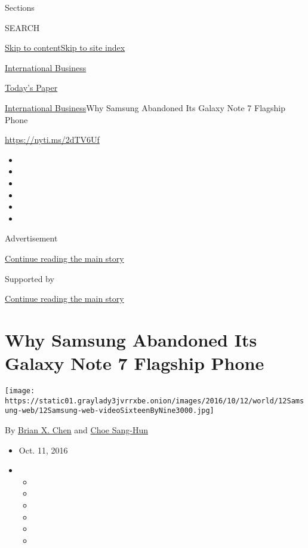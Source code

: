 Sections

SEARCH

\protect\hyperlink{site-content}{Skip to
content}\protect\hyperlink{site-index}{Skip to site index}

\href{https://www.nytimes3xbfgragh.onion/section/business}{International
Business}

\href{https://myaccount.nytimes3xbfgragh.onion/auth/login?response_type=cookie\&client_id=vi}{}

\href{https://www.nytimes3xbfgragh.onion/section/todayspaper}{Today's
Paper}

\href{/section/business}{International Business}\textbar{}Why Samsung
Abandoned Its Galaxy Note 7 Flagship Phone

\url{https://nyti.ms/2dTV6Uf}

\begin{itemize}
\item
\item
\item
\item
\item
\item
\end{itemize}

Advertisement

\protect\hyperlink{after-top}{Continue reading the main story}

Supported by

\protect\hyperlink{after-sponsor}{Continue reading the main story}

\hypertarget{why-samsung-abandoned-its-galaxy-note-7-flagship-phone}{%
\section{Why Samsung Abandoned Its Galaxy Note 7 Flagship
Phone}\label{why-samsung-abandoned-its-galaxy-note-7-flagship-phone}}

\texttt{[image: https://static01.graylady3jvrrxbe.onion/images/2016/10/12/world/12Samsung-web/12Samsung-web-videoSixteenByNine3000.jpg]}

By \href{http://www.nytimes3xbfgragh.onion/by/brian-x-chen}{Brian X.
Chen} and \href{http://www.nytimes3xbfgragh.onion/by/choe-sang-hun}{Choe
Sang-Hun}

\begin{itemize}
\item
  Oct. 11, 2016
\item
  \begin{itemize}
  \item
  \item
  \item
  \item
  \item
  \item
  \end{itemize}
\end{itemize}

